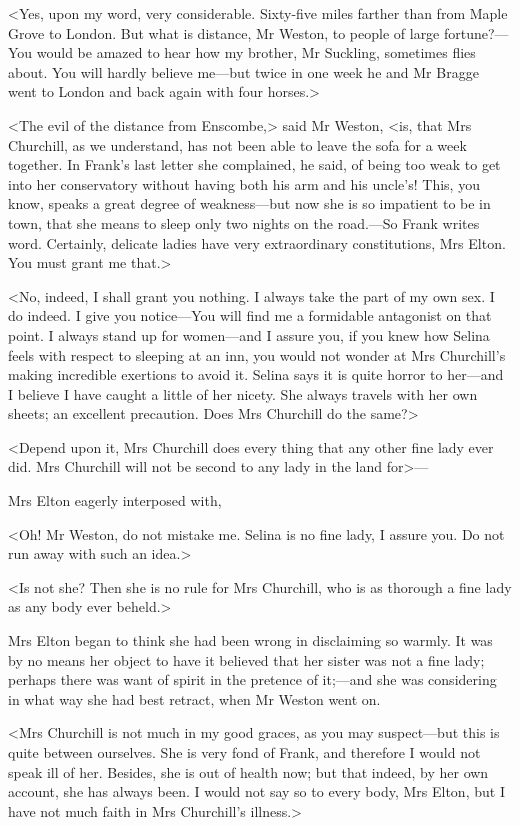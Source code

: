<Yes, upon my word, very considerable. Sixty-five miles farther than from Maple Grove to London. But what is distance, Mr Weston, to people of large fortune?—You would be amazed to hear how my brother, Mr Suckling, sometimes flies about. You will hardly believe me—but twice in one week he and Mr Bragge went to London and back again with four horses.>

<The evil of the distance from Enscombe,> said Mr Weston, <is, that Mrs Churchill, as we understand, has not been able to leave the sofa for a week together. In Frank's last letter she complained, he said, of being too weak to get into her conservatory without having both his arm and his uncle's! This, you know, speaks a great degree of weakness—but now she is so impatient to be in town, that she means to sleep only two nights on the road.—So Frank writes word. Certainly, delicate ladies have very extraordinary constitutions, Mrs Elton. You must grant me that.>

<No, indeed, I shall grant you nothing. I always take the part of my own sex. I do indeed. I give you notice—You will find me a formidable antagonist on that point. I always stand up for women—and I assure you, if you knew how Selina feels with respect to sleeping at an inn, you would not wonder at Mrs Churchill's making incredible exertions to avoid it. Selina says it is quite horror to her—and I believe I have caught a little of her nicety. She always travels with her own sheets; an excellent precaution. Does Mrs Churchill do the same?>

<Depend upon it, Mrs Churchill does every thing that any other fine lady ever did. Mrs Churchill will not be second to any lady in the land for>—

Mrs Elton eagerly interposed with,

<Oh! Mr Weston, do not mistake me. Selina is no fine lady, I assure you. Do not run away with such an idea.>

<Is not she? Then she is no rule for Mrs Churchill, who is as thorough a fine lady as any body ever beheld.>

Mrs Elton began to think she had been wrong in disclaiming so warmly. It was by no means her object to have it believed that her sister was not a fine lady; perhaps there was want of spirit in the pretence of it;—and she was considering in what way she had best retract, when Mr Weston went on.

<Mrs Churchill is not much in my good graces, as you may suspect—but this is quite between ourselves. She is very fond of Frank, and therefore I would not speak ill of her. Besides, she is out of health now; but that indeed, by her own account, she has always been. I would not say so to every body, Mrs Elton, but I have not much faith in Mrs Churchill's illness.>

